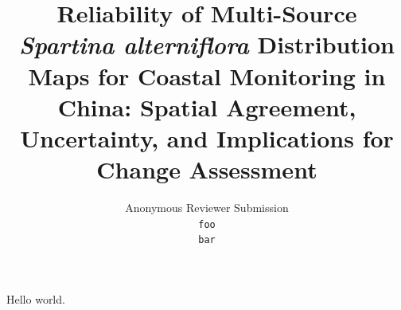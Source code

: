 \documentclass[11pt]{article}
\title{Reliability of Multi-Source \textit{Spartina alterniflora} Distribution Maps
for Coastal Monitoring in China: Spatial Agreement, Uncertainty, and Implications
for Change Assessment}
\author{Anonymous Reviewer Submission \\ \texttt{foo \\ bar}}
\date{}
\begin{document}
\maketitle

Hello world.
\end{document}
